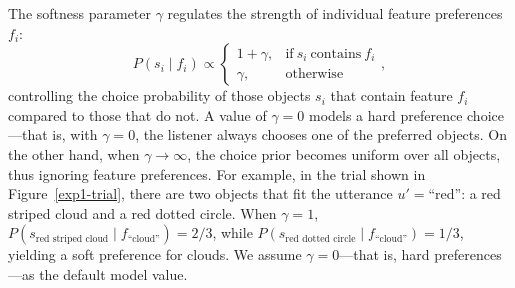 \documentclass[10pt,a4paper]{article}
\begin{document}
The softness parameter $\gamma$ regulates the strength of individual feature preferences $f_i$:
$$ P(s_i \mid f_i) \propto \begin{cases}
1 + \gamma, & \text{if}\ s_i\ \text{contains}\ f_i \\
\gamma, & \text{otherwise}
\end{cases},$$
controlling the choice probability of those objects $s_i$ that contain feature $f_i$ compared to those that do not.  
A value of $\gamma=0$ models a hard preference choice---that is, with $\gamma=0$, the listener always chooses one of the preferred objects. 
On the other hand, when $\gamma \rightarrow \infty$, the choice prior becomes uniform over all objects, thus ignoring feature preferences. 
 For example, in the trial shown in Figure~\ref{exp1-trial}, there are two objects that fit the utterance $u'=\text{``red''}$: a red striped cloud and a red dotted circle.
 When $\gamma=1$, $P(s_{\textrm{red\ striped\ cloud}}\mid f_{\textrm{``cloud''}}) = 2/3$, while
 $P(s_{\textrm{red\ dotted\ circle}}\mid f_{\textrm{``cloud''}})= 1/3$, yielding a soft preference for clouds.
 We assume $\gamma=0$---that is, hard preferences---as the default model value.
\end{document}
